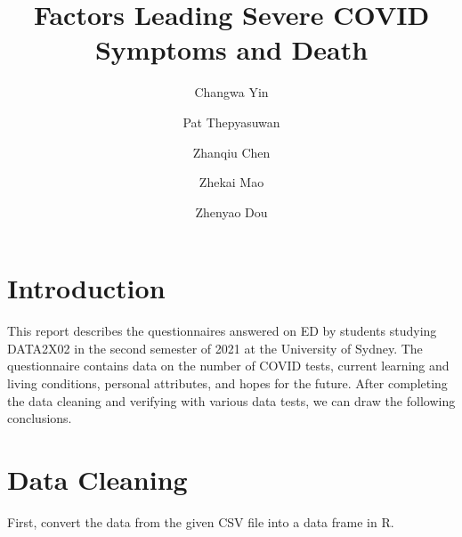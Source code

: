 \documentclass[letterpaper,9pt,twocolumn,twoside,]{pinp}
\title{Factors Leading Severe COVID Symptoms and Death}
\author[true]{Changwa Yin}
\author[p]{Pat Thepyasuwan}
\author[c]{Zhanqiu Chen}
\author[m]{Zhekai Mao}
\author[d]{Zhenyao Dou}
\affil[s]{The University of Sydney, NSW, 2008}
\begin{document}
\verticaladjustment{-2pt}

\maketitle
\thispagestyle{firststyle}



\hypertarget{introduction}{%
\section{Introduction}\label{introduction}}

This report describes the questionnaires answered on ED by students
studying DATA2X02 in the second semester of 2021 at the University of
Sydney. The questionnaire contains data on the number of COVID tests,
current learning and living conditions, personal attributes, and hopes
for the future. After completing the data cleaning and verifying with
various data tests, we can draw the following conclusions.

\hypertarget{data-cleaning}{%
\section{Data Cleaning}\label{data-cleaning}}

First, convert the data from the given CSV file into a data frame in R.





\end{document}
